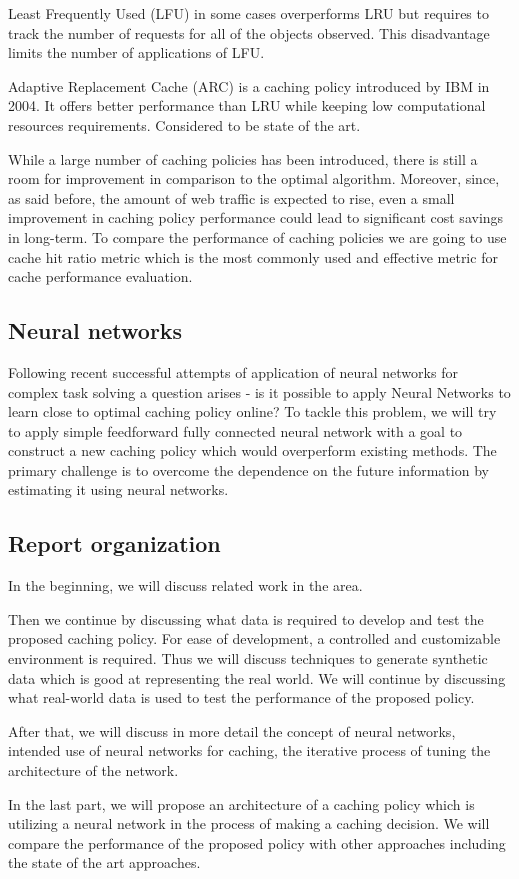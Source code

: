 Least Frequently Used (LFU) in some cases overperforms LRU but requires to track the number of requests for all of the objects observed. This disadvantage limits the number of applications of LFU.

Adaptive Replacement Cache (ARC)\cite{3} is a caching policy introduced by IBM\cite{4} in 2004. It offers better performance than LRU while keeping low computational resources requirements. Considered to be state of the art.

While a large number of caching policies has been introduced, there is still a room for improvement in comparison to the optimal algorithm. Moreover, since, as said before, the amount of web traffic is expected to rise, even a small improvement in caching policy performance could lead to significant cost savings in long-term. To compare the performance of caching policies we are going to use cache hit ratio\cite{5} metric which is the most commonly used and effective metric for cache performance evaluation.

\subsection{Neural networks}

Following recent successful attempts of application of neural networks\cite{6} for complex task solving\cite{7,8,9} a question arises - is it possible to apply Neural Networks to learn close to optimal caching policy online? To tackle this problem, we will try to apply simple feedforward fully connected neural network with a goal to construct a new caching policy which would overperform existing methods. The primary challenge is to overcome the dependence on the future information by estimating it using neural networks.

\subsection{Report organization}

In the beginning, we will discuss related work in the area.

Then we continue by discussing what data is required to develop and test the proposed caching policy. For ease of development, a controlled and customizable environment is required. Thus we will discuss techniques to generate synthetic data which is good at representing the real world. We will continue by discussing what real-world data is used to test the performance of the proposed policy.

After that, we will discuss in more detail the concept of neural networks, intended use of neural networks for caching, the iterative process of tuning the architecture of the network.

In the last part, we will propose an architecture of a caching policy which is utilizing a neural network in the process of making a caching decision. We will compare the performance of the proposed policy with other approaches including the state of the art approaches.



